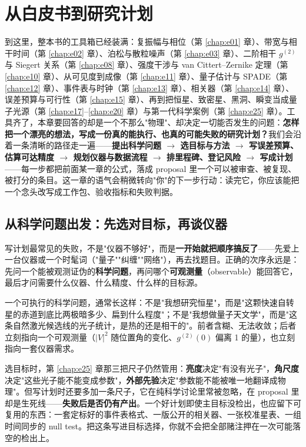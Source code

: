 \chapter{从白皮书到研究计划}
\label{chap:e28}

\begin{chapteropening}
到这里，整本书的工具箱已经装满：复振幅与相位（第 \ref{chap:e01} 章）、带宽与相干时间（第 \ref{chap:e02} 章）、泊松与散粒噪声（第 \ref{chap:e03} 章）、二阶相干 \(g^{(2)}\) 与 Siegert 关系（第 \ref{chap:e08} 章）、强度干涉与 van Cittert--Zernike 定理（第 \ref{chap:e10} 章）、从可见度到成像（第 \ref{chap:e11} 章）、量子估计与 SPADE（第 \ref{chap:e12} 章）、事件表与时钟（第 \ref{chap:e13} 章）、相关器（第 \ref{chap:e14} 章）、误差预算与可行性（第 \ref{chap:e15} 章）、再到把恒星、致密星、黑洞、瞬变当成量子光源（第 \ref{chap:e17}--\ref{chap:e20} 章）与第一代科学案例（第 \ref{chap:e25} 章）。工具齐了，本章要回答的却是一个不那么"物理"、却决定一切能否发生的问题：\textbf{怎样把一个漂亮的想法，写成一份真的能执行、也真的可能失败的研究计划？}我们会沿着一条清晰的路径走一遍——\textbf{提出科学问题 \(\to\) 选目标与方法 \(\to\) 写误差预算、估算可达精度 \(\to\) 规划仪器与数据流程 \(\to\) 排里程碑、登记风险 \(\to\) 写成计划}——每一步都把前面某一章的公式，落成 proposal 里一个可以被审查、被复现、被打分的条目。这一章的语气会稍微转向"你"的下一步行动：读完它，你应该能把一个念头改写成工作包、验收指标和失败判据。
\end{chapteropening}

\section{从科学问题出发：先选对目标，再谈仪器}
\label{sec:e28-question}

写计划最常见的失败，不是"仪器不够好"，而是\textbf{一开始就把顺序搞反了}——先爱上一台仪器或一个时髦词（"量子""纠缠""网络"），再去找题目。正确的次序永远是：先问一个能被观测证伪的\textbf{科学问题}，再问哪个\textbf{可观测量}（observable）能回答它，最后才问需要什么仪器、什么精度、什么样的目标源。

一个可执行的科学问题，通常长这样：不是"我想研究恒星"，而是"这颗快速自转星的赤道到底比两极暗多少、扁到什么程度"；不是"我想做量子天文学"，而是"这条自然激光候选线的光子统计，是热的还是相干的"。前者含糊、无法收敛；后者立刻指向一个可观测量（\(|V|^2\) 随位置角的变化、\(g^{(2)}(0)\) 偏离 1 的量），也立刻指向一套仪器需求。

选目标时，第 \ref{chap:e25} 章那三把尺子仍然管用：\textbf{亮度}决定"有没有光子"，\textbf{角尺度}决定"这些光子能不能变成参数"，\textbf{外部先验}决定"参数能不能被唯一地翻译成物理"。但写计划时还要多加一条尺子，它在纯科学讨论里常被忽略，在 proposal 里却是生死线——\textbf{失败后是否仍有产出}。一个好计划即使主目标没检出，也应留下可复用的东西：一套定标好的事件表格式、一版公开的相关器、一张校准星表、一组时间同步的 null test。把这条写进目标选择，你就不会把全部赌注押在一次可能落空的检出上。

